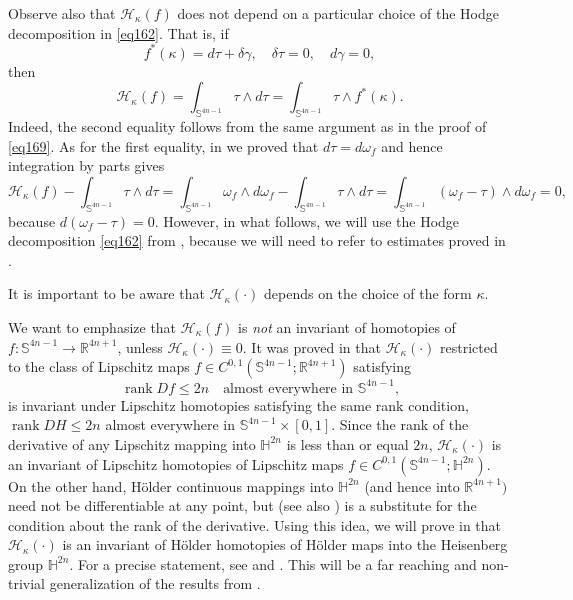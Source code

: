 \documentclass[intlimits,12pt,reqno]{amsart}
\newcommand{\Sph}{\mathbb S}
\newcommand{\bbbh}{\mathbb H}
\newcommand{\R}{\mathbb R}
\numberwithin{equation}{section}
\theoremstyle{definition}
\newcommand{\HI}{\mathcal{H}}
\def\rank{\operatorname{rank}}
\begin{document}
Observe also that $\HI_\kappa(f)$ does not depend on a particular choice of the Hodge decomposition in \eqref{eq162}. That is, if
$$
f^*(\kappa)=d\tau+\delta\gamma,
\quad
\delta\tau=0,
\quad
d\gamma=0,
$$
then
\begin{equation}
\label{eq170}
\HI_\kappa(f)=\int_{\Sph^{4n-1}}\tau\wedge d\tau=\int_{\Sph^{4n-1}}\tau\wedge f^*(\kappa).
\end{equation}
Indeed, the second equality follows from the same argument as in the proof of \eqref{eq169}. As for the first equality, in  we proved that $d\tau=d\omega_f$ and hence integration by parts gives
$$
\HI_\kappa(f)-\int_{\Sph^{4n-1}}\tau\wedge d\tau=\int_{\Sph^{4n-1}}\omega_f\wedge d\omega_f -
\int_{\Sph^{4n-1}}\tau\wedge d\tau=
\int_{\Sph^{4n-1}}(\omega_f-\tau)\wedge d\omega_f=0,
$$
because $d(\omega_f-\tau)=0$.
However, in what follows, we will use the Hodge decomposition \eqref{eq162} from , because we will need to refer to estimates proved in .

It is important to be aware that $\HI_\kappa(\cdot)$ depends on the choice of the form $\kappa$.


We want to emphasize that $\HI_\kappa(f)$ is {\em not} an invariant of homotopies of $f:\Sph^{4n-1}\to\R^{4n+1}$, unless $\HI_\kappa(\cdot)\equiv 0$. 
It was proved in \cite{HST14} that $\HI_{\kappa}(\cdot)$ restricted to the class of Lipschitz maps
$f\in C^{0,1}(\Sph^{4n-1};\R^{4n+1})$ satisfying 
\[
\rank Df \leq 2n \quad \text{almost everywhere in $\Sph^{4n-1}$,}                                                      \]
is invariant under Lipschitz homotopies satisfying the same rank condition,
$\rank DH\leq 2n$ almost everywhere in $\Sph^{4n-1}\times [0,1]$. Since the rank of the derivative of any Lipschitz mapping into $\bbbh^{2n}$ is less than or equal $2n$, $\HI_\kappa(\cdot)$ is an invariant of Lipschitz homotopies of Lipschitz maps $f\in C^{0,1}(\Sph^{4n-1};\bbbh^{2n})$.
On the other hand, H\"older continuous mappings into $\bbbh^{2n}$ (and hence into $\R^{4n+1})$ need not be differentiable at any point, but  (see also ) is a substitute for the condition about the rank of the derivative. Using this idea,  we will prove in  that $\HI_\kappa(\cdot)$
is an invariant of H\"older homotopies of H\"older maps into the Heisenberg group $\bbbh^{2n}$. 
For a precise statement, see  and .
This will be a far reaching and non-trivial generalization of the results from \cite{HST14}.
\end{document}
